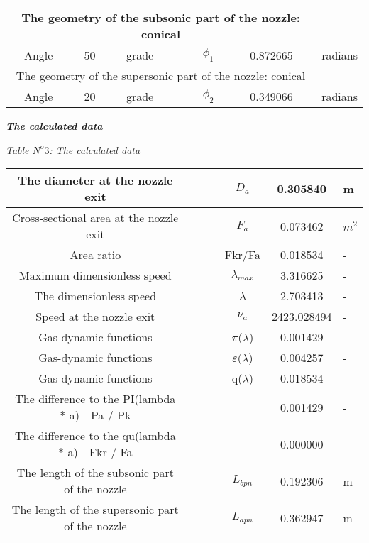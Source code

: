 \begin{center}
\begin{tabular}{  | c | c | c | c | c | c | c | }
\hline
\multicolumn{6}{|c}{The geometry of the subsonic part of the nozzle: conical} & \\
\hline
Angle & 50 & grade &  & $\phi_1$ & 0.872665 & radians \\
\hline
\multicolumn{6}{|c}{The geometry of the supersonic part of the nozzle: conical} & \\
\hline
Angle & 20 & grade &  & $\phi_2$ & 0.349066 & radians \\
\hline
\end{tabular}
\begin{center}
\textbf{\textit{The calculated data}}\\
\end{center}
\begin{flushright}
\textit{Table $N^o 3$: The calculated data}\\
\end{flushright}
\begin{tabular}{  | c | p{1.5cm} | p{1.5cm} | p{1.5cm} | c | c | p{1.5cm} | }
\hline
The diameter at the nozzle exit &  &  &  & $D_a$ & 0.305840 & m \\
\hline
Cross-sectional area at the nozzle exit &  &  &  & $F_a$ & 0.073462 & $m^2$ \\
\hline
Area ratio &  &  &  & Fkr/Fa & 0.018534 & - \\
\hline
Maximum dimensionless speed &  &  &  & $\lambda_{max}$ & 3.316625 & - \\
\hline
The dimensionless speed &  &  &  & $\lambda$ & 2.703413 & - \\
\hline
Speed at the nozzle exit &  &  &  & $\nu_a$ & 2423.028494 & - \\
\hline
Gas-dynamic functions &  &  &  & $\pi(\lambda$) & 0.001429 & - \\
\hline
Gas-dynamic functions &  &  &  & $\varepsilon(\lambda$) & 0.004257 & - \\
\hline
Gas-dynamic functions &  &  &  & q($\lambda$) & 0.018534 & - \\
\hline
The difference to the PI(lambda * a) - Pa / Pk &  &  &  &  & 0.001429 & - \\
\hline
The difference to the qu(lambda * a) - Fkr / Fa &  &  &  &  & 0.000000 & - \\
\hline
The length of the subsonic part of the nozzle &  &  &  & $L_{bpn}$ & 0.192306 & m \\
\hline
The length of the supersonic part of the nozzle &  &  &  & $L_{apn}$ & 0.362947 & m  \\
\hline
\end{tabular} 
\end{center}
